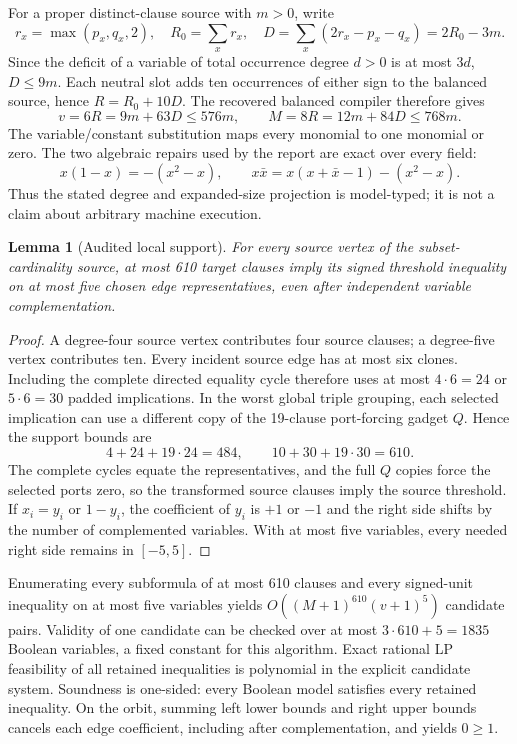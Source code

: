 \documentclass[11pt]{article}
\newtheorem{lemma}{Lemma}
\begin{document}
For a proper distinct-clause source with $m>0$, write
\[
 r_x=\max(p_x,q_x,2),\quad R_0=\sum_x r_x,\quad
 D=\sum_x(2r_x-p_x-q_x)=2R_0-3m.
\]
Since the deficit of a variable of total occurrence degree $d>0$ is at most
$3d$, $D\le9m$.  Each neutral slot adds ten occurrences of either sign to
the balanced source, hence $R=R_0+10D$.  The recovered balanced compiler
therefore gives
\[
 v=6R=9m+63D\le576m,\qquad
 M=8R=12m+84D\le768m.
\]
The variable/constant substitution maps every monomial to one monomial or
zero.  The two algebraic repairs used by the report are exact over every
field:
\[
 x(1-x)=-(x^2-x),\qquad
 x\bar x=x(x+\bar x-1)-(x^2-x).
\]
Thus the stated degree and expanded-size projection is model-typed; it is
not a claim about arbitrary machine execution.

\begin{lemma}[Audited local support]
For every source vertex of the subset-cardinality source, at most 610 target
clauses imply its signed threshold inequality on at most five chosen edge
representatives, even after independent variable complementation.
\end{lemma}
\begin{proof}
A degree-four source vertex contributes four source clauses; a degree-five
vertex contributes ten.  Every incident source edge has at most six clones.
Including the complete directed equality cycle therefore uses at most
$4\cdot6=24$ or $5\cdot6=30$ padded implications.  In the worst global
triple grouping, each selected implication can use a different copy of the
19-clause port-forcing gadget $Q$.  Hence the support bounds are
\[
4+24+19\cdot24=484,\qquad
10+30+19\cdot30=610.
\]
The complete cycles equate the representatives, and the full $Q$ copies
force the selected ports zero, so the transformed source clauses imply the
source threshold.  If $x_i=y_i$ or $1-y_i$, the coefficient of $y_i$ is
$+1$ or $-1$ and the right side shifts by the number of complemented
variables.  With at most five variables, every needed right side remains in
$[-5,5]$.
\end{proof}

Enumerating every subformula of at most 610 clauses and every signed-unit
inequality on at most five variables yields
$O((M+1)^{610}(v+1)^5)$ candidate pairs.  Validity of one candidate can be
checked over at most $3\cdot610+5=1835$ Boolean variables, a fixed constant
for this algorithm.  Exact rational LP feasibility of all retained
inequalities is polynomial in the explicit candidate system.  Soundness is
one-sided: every Boolean model satisfies every retained inequality.  On the
orbit, summing left lower bounds and right upper bounds cancels each edge
coefficient, including after complementation, and yields $0\ge1$.
\end{document}
